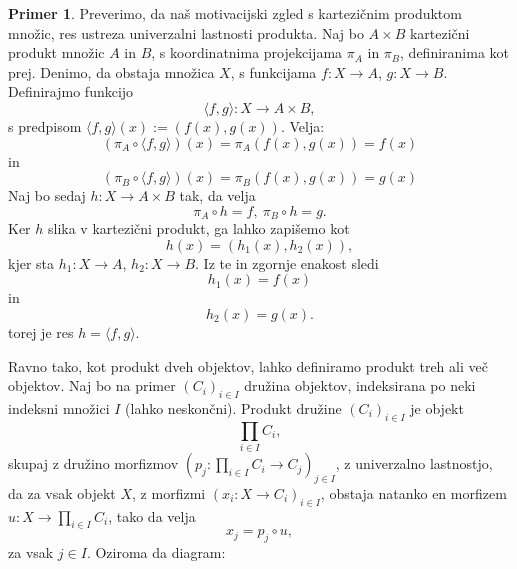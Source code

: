 \documentclass[12pt,a4paper]{book}
\theoremstyle{definition}
\theoremstyle{plain}
\theoremstyle{definition}
\newtheorem{primer}{Primer}[section]
\theoremstyle{remark}
\begin{document}
\begin{primer}
Preverimo, da naš motivacijski zgled s kartezičnim produktom množic, res ustreza univerzalni lastnosti produkta. Naj bo $A \times B$ kartezični produkt množic $A$ in $B$, s koordinatnima projekcijama $\pi_A$ in $\pi_B$, definiranima kot prej. Denimo, da obstaja množica $X$, s funkcijama $f : X \to A$, $g : X \to B$. Definirajmo funkcijo 
$$\langle f,g \rangle : X \to A \times B,$$
s predpisom $\langle f,g \rangle(x) := (f(x),g(x))$. Velja:
$$ (\pi_A \circ \langle f,g \rangle)(x) = \pi_A(f(x),g(x)) = f(x) $$
in 
$$ (\pi_B \circ \langle f,g \rangle)(x) = \pi_B(f(x),g(x)) = g(x) $$
Naj bo sedaj $h : X \to A \times B$ tak, da velja
$$\pi_A \circ h = f, \ \pi_B \circ h = g.$$
Ker $h$ slika v kartezični produkt, ga lahko zapišemo kot
$$h(x) = (h_1(x),h_2(x)),$$
kjer sta $h_1 : X \to A$, $h_2 : X \to B$.
Iz te in zgornje enakost sledi
$$h_1(x) = f(x)$$
in $$h_2(x) = g(x).$$
torej je res $h = \langle f,g \rangle$.
\end{primer}
%
Ravno tako, kot produkt dveh objektov, lahko definiramo produkt treh ali več objektov. Naj bo na primer $(C_i)_{i \in I}$ družina objektov, indeksirana po neki indeksni množici $I$ (lahko neskončni). Produkt družine $(C_i)_{i \in I}$ je objekt
$$\prod_{i \in I}C_i,$$
skupaj z družino morfizmov $(p_j : \prod_{i \in I}C_i \to C_j)_{j \in I}$, z univerzalno lastnostjo, da za vsak objekt $X$, z morfizmi $(x_i : X \to C_i)_{i \in I}$, obstaja natanko en morfizem $u : X \to \prod_{i \in I}C_i$, tako da velja
$$x_j = p_j \circ u,$$
za vsak $j \in I$. Oziroma da diagram:
\end{document}

